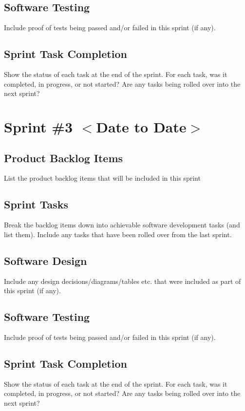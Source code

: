 \documentclass{scrreprt}
\begin{document}
% 
\subsection{Software Testing}
Include proof of tests being passed and/or failed in this sprint (if any).

% 
\subsection{Sprint Task Completion}
Show the status of each task at the end of the sprint. For each task, was it completed, in progress, or not started? Are any tasks being rolled over into the next sprint?

% 
% 
\section{Sprint \#3 $<$Date to Date$>$}

% 
\subsection{Product Backlog Items}
List the product backlog items that will be included in this sprint

% 
\subsection{Sprint Tasks}
Break the backlog items down into achievable software development tasks (and list them). Include any tasks that have been rolled over from the last sprint.

% 
\subsection{Software Design}
Include any design decisions/diagrams/tables etc. that were included as part of this sprint (if any).

% 
\subsection{Software Testing}
Include proof of tests being passed and/or failed in this sprint (if any).

% 
\subsection{Sprint Task Completion}
Show the status of each task at the end of the sprint. For each task, was it completed, in progress, or not started? Are any tasks being rolled over into the next sprint?
\end{document}
